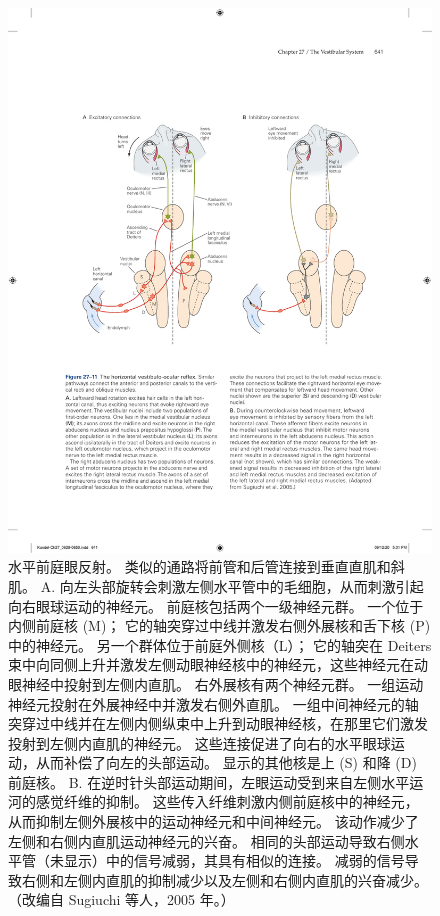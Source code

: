 \begin{figure}[htbp]
	\centering
	\includegraphics[width=0.9\linewidth]{chap27/fig_27_11}
	\caption{水平前庭眼反射。 类似的通路将前管和后管连接到垂直直肌和斜肌。 A. 向左头部旋转会刺激左侧水平管中的毛细胞，从而刺激引起向右眼球运动的神经元。 前庭核包括两个一级神经元群。 一个位于内侧前庭核 (M)； 它的轴突穿过中线并激发右侧外展核和舌下核 (P) 中的神经元。 另一个群体位于前庭外侧核（L）； 它的轴突在 Deiters 束中向同侧上升并激发左侧动眼神经核中的神经元，这些神经元在动眼神经中投射到左侧内直肌。 右外展核有两个神经元群。 一组运动神经元投射在外展神经中并激发右侧外直肌。 一组中间神经元的轴突穿过中线并在左侧内侧纵束中上升到动眼神经核，在那里它们激发投射到左侧内直肌的神经元。 这些连接促进了向右的水平眼球运动，从而补偿了向左的头部运动。 显示的其他核是上 (S) 和降 (D) 前庭核。 B. 在逆时针头部运动期间，左眼运动受到来自左侧水平运河的感觉纤维的抑制。 这些传入纤维刺激内侧前庭核中的神经元，从而抑制左侧外展核中的运动神经元和中间神经元。 该动作减少了左侧和右侧内直肌运动神经元的兴奋。 相同的头部运动导致右侧水平管（未显示）中的信号减弱，其具有相似的连接。 减弱的信号导致右侧和左侧内直肌的抑制减少以及左侧和右侧内直肌的兴奋减少。 （改编自 Sugiuchi 等人，2005 年。）}
	\label{fig:27_11}
\end{figure}


